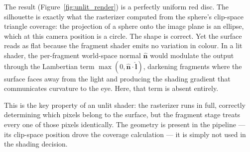 \documentclass[11pt]{article}
\begin{document}
The result (Figure~\ref{fig:unlit_render}) is a perfectly uniform red disc. The silhouette is exactly what the rasterizer computed from the sphere's clip-space triangle coverage: the projection of a sphere onto the image plane is an ellipse, which at this camera position is a circle. The shape is correct. Yet the surface reads as flat because the fragment shader emits no variation in colour. In a lit shader, the per-fragment world-space normal $\hat{\mathbf{n}}$ would modulate the output through the Lambertian term $\max(0, \hat{\mathbf{n}} \cdot \hat{\mathbf{l}})$, darkening fragments where the surface faces away from the light and producing the shading gradient that communicates curvature to the eye. Here, that term is absent entirely.

This is the key property of an unlit shader: the rasterizer runs in full, correctly determining which pixels belong to the surface, but the fragment stage treats every one of those pixels identically. The geometry is present in the pipeline --- its clip-space position drove the coverage calculation --- it is simply not used in the shading decision.
\end{document}
